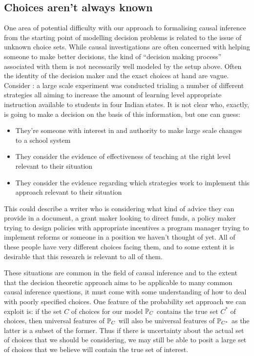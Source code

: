 \subsection{Choices aren't always known}

One area of potential difficulty with our approach to formalising causal inference from the starting point of modelling decision problems is related to the issue of unknown choice sets. While causal investigations are often concerned with helping someone to make better decisions, the kind of ``decision making process'' associated with them is not necessarily well modeled by the setup above. Often the identity of the decision maker and the exact choices at hand are vague. Consider \citet{banerjee_mainstreaming_2016}: a large scale experiment was conducted trialing a number of different strategies all aiming to increase the amount of learning level appropriate instruction available to students in four Indian states. It is not clear who, exactly, is going to make a decision on the basis of this information, but one can guess:

\begin{itemize}
    \item They're someone with interest in and authority to make large scale changes to a school system
    \item They consider the evidence of effectiveness of teaching at the right level relevant to their situation
    \item They consider the evidence regarding which strategies work to implement this approach relevant to their situation
\end{itemize}

This could describe a writer who is considering what kind of advice they can provide in a document, a grant maker looking to direct funds, a policy maker trying to design policies with appropriate incentives a program manager trying to implement reforms or someone in a position we haven't thought of yet. All of these people have very different choices facing them, and to some extent it is desirable that this research is relevant to all of them.

These situations are common in the field of causal inference and to the extent that the decision theoretic approach aims to be applicable to many common causal inference questions, it must come with some understanding of how to deal with poorly specified choices. One feature of the probability set approach we can exploit is: if the set $C$ of choices for our model $\mathbb{P}_C$ contains the true set $C^*$ of choices, then universal features of $\mathbb{P}_C$ will also be universal features of $\mathbb{P}_{C^*}$ as the latter is a subset of the former. Thus if there is uncertainty about the actual set of choices that we should be considering, we may still be able to posit a large set of choices that we believe will contain the true set of interest.